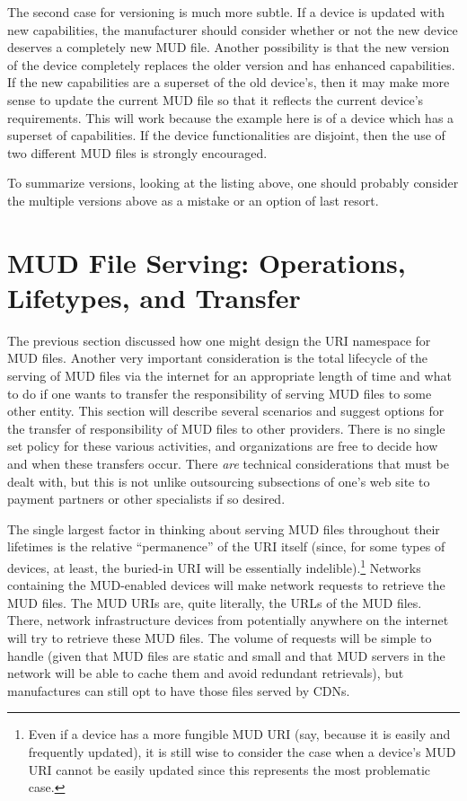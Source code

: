 \documentclass[conference]{IEEEtran}
\begin{document}
The second case for versioning is much more subtle.  If a device is
updated with new capabilities, the manufacturer should consider whether
or not the new device deserves a completely new MUD file.  Another
possibility is that the new version of the device completely replaces
the older version and has enhanced capabilities.  If the new
capabilities are a superset of the old device's, then it may make more
sense to update the current MUD file so that it reflects the current
device's requirements.  This will work because the example here is of
a device which has a superset of capabilities.  If the device
functionalities are disjoint, then the use of two different MUD files
is strongly encouraged.

To summarize versions, looking at the listing above, one should
probably consider the multiple versions above as a mistake or an
option of last resort.

\section{MUD File Serving: Operations, Lifetypes, and Transfer}

The previous section discussed how one might design the URI namespace
for MUD files.  Another very important consideration is the total
lifecycle of the serving of MUD files via the internet for an
appropriate length of time and what to do if one wants to transfer the
responsibility of serving MUD files to some other entity.  This
section will describe several scenarios and suggest options for the
transfer of responsibility of MUD files to other providers.  There is
no single set policy for these various activities, and organizations
are free to decide how and when these transfers occur.  There {\em
  are} technical considerations that must be dealt with, but this is
not unlike outsourcing subsections of one's web site to payment
partners or other specialists if so desired.

The single largest factor in thinking about serving MUD files
throughout their lifetimes is the relative ``permanence'' of the URI
itself (since, for some types of devices, at least, the buried-in URI
will be essentially indelible).\footnote{Even if a device has a more
  fungible MUD URI (say, because it is easily and frequently updated),
  it is still wise to consider the case when a device's MUD URI cannot
  be easily updated since this represents the most problematic case.}
Networks containing the MUD-enabled devices will make network requests
to retrieve the MUD files.  The MUD URIs are, quite literally, the
URLs of the MUD files.  There, network infrastructure devices from
potentially anywhere on the internet will try to retrieve these MUD
files.  The volume of requests will be simple to handle (given that
MUD files are static and small and that MUD servers in the network
will be able to cache them and avoid redundant retrievals), but
manufactures can still opt to have those files served by CDNs.
\end{document}
